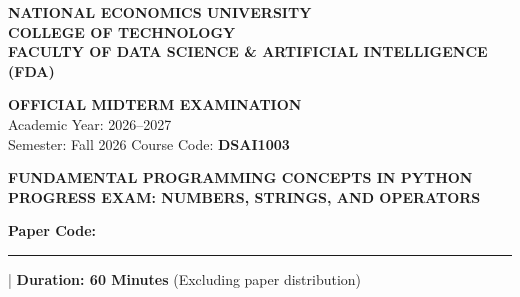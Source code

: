 \documentclass[11pt,a4paper]{article}
\begin{document}

\noindent
\begin{minipage}[t]{0.64\textwidth}
  \raggedright\small
  \textbf{NATIONAL ECONOMICS UNIVERSITY}\\
  \textbf{COLLEGE OF TECHNOLOGY}\\
  \textbf{FACULTY OF DATA SCIENCE \& ARTIFICIAL INTELLIGENCE (FDA)}
\end{minipage}%
\hfill
\begin{minipage}[t]{0.34\textwidth}
  \raggedleft\footnotesize
  \textbf{OFFICIAL MIDTERM EXAMINATION}\\
  Academic Year: 2026--2027\\
  Semester: Fall 2026 \quad Course Code: \textbf{DSAI1003}
\end{minipage}

\vspace{0.2em}

\begin{center}
  {\Large\bfseries\color{ForestGreen} FUNDAMENTAL PROGRAMMING CONCEPTS IN PYTHON}\\[0.10em]
  {\normalsize\bfseries PROGRESS EXAM: NUMBERS, STRINGS, AND OPERATORS}\\[0.10em]
  {\normalsize\textbf{Paper Code:} \rule{1.6cm}{0.4pt} \quad | \quad \textbf{Duration: 60 Minutes} (Excluding paper distribution)}
\end{center}

\vspace{0.1em}
\end{document}
